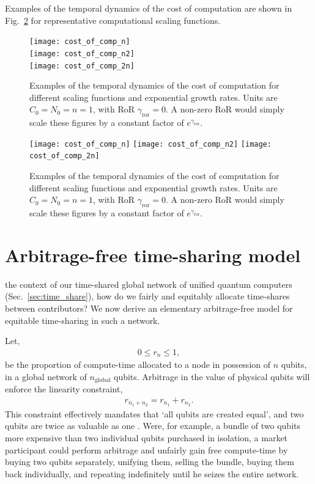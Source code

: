 Examples of the temporal dynamics of the cost of computation are shown in Fig.~\ref{fig:econ_cost_of_comp} for representative computational scaling functions.

\pubmode
\begin{figure}[!htbp]
\texttt{[image: cost\_of\_comp\_n]}\\
\texttt{[image: cost\_of\_comp\_n2]}\\
\texttt{[image: cost\_of\_comp\_2n]}
\captionspacefig \caption{Examples of the temporal dynamics of the cost of computation for different scaling functions and exponential growth rates. Units are \mbox{$C_0=N_0=n=1$}, with RoR \mbox{$\gamma_\mathrm{ror}=0$}. A non-zero RoR would simply scale these figures by a constant factor of $e^{\gamma_\mathrm{ror}}$.}\label{fig:econ_cost_of_comp}
\end{figure}
\else
\begin{figure}[!htbp]
\texttt{[image: cost\_of\_comp\_n]}
\texttt{[image: cost\_of\_comp\_n2]}
\texttt{[image: cost\_of\_comp\_2n]}
\captionspacefig \caption{Examples of the temporal dynamics of the cost of computation for different scaling functions and exponential growth rates. Units are \mbox{$C_0=N_0=n=1$}, with RoR \mbox{$\gamma_\mathrm{ror}=0$}. A non-zero RoR would simply scale these figures by a constant factor of $e^{\gamma_\mathrm{ror}}$.}\label{fig:econ_cost_of_comp}
\end{figure}
\fi

%
%

\section{Arbitrage-free time-sharing model}\label{sec:arb_free_time_share} 

 the context of our time-shared global network of unified quantum computers (Sec.~\ref{sec:time_share}), how do we fairly and equitably allocate time-shares between contributors? We now derive an elementary arbitrage-free model for equitable time-sharing in such a network.

Let,
\begin{align}
	0\leq r_n \leq 1,
\end{align}
be the proportion of compute-time allocated to a node in possession of $n$ qubits, in a global network of $n_\mathrm{global}$ qubits. Arbitrage in the value of physical qubits will enforce the linearity constraint,
\begin{align}
	r_{n_1+n_2} = r_{n_1} + r_{n_2}.
\end{align}
This constraint effectively mandates that `all qubits are created equal', and two qubits are twice as valuable as one . Were, for example, a bundle of two qubits more expensive than two individual qubits purchased in isolation, a market participant could perform arbitrage and unfairly gain free compute-time by buying two qubits separately, unifying them, selling the bundle, buying them back individually, and repeating indefinitely until he seizes the entire network.

